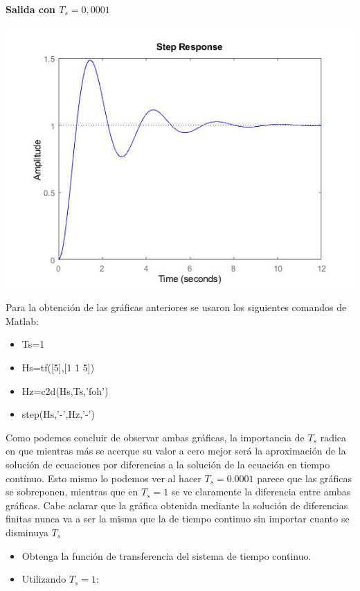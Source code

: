 \noindent \textbf{Salida con $T_s=0,0001$}

\noindent \includegraphics[scale=0.6]{./ImagenParte1y2/SalidaTs00001}

Para la obtención de las gráficas anteriores se usaron los siguientes comandos de Matlab:

\begin{itemize}
\item Ts=1
\item Hs=tf([5],[1 1 5])
\item Hz=c2d(Hs,Ts,'foh')
\item step(Hs,'-',Hz,'-')
\end{itemize}


Como podemos concluir de observar ambas gráficas, la importancia de $T_s$ radica en que mientras más se acerque su valor a cero mejor será la aproximación de la solución de ecuaciones por diferencias a la solución de la ecuación en tiempo contínuo. Esto mismo lo podemos ver al hacer $T_s=0.0001$ parece que las gráficas se sobreponen, mientras que en $T_s=1$ se ve claramente la diferencia entre ambas gráficas. Cabe aclarar que la gráfica obtenida mediante la solución de diferencias finitas nunca va a ser la misma que la de tiempo continuo sin importar cuanto se disminuya $T_s$

\begin{itemize}
	\item Obtenga la función de transferencia del sistema de tiempo continuo.
	\item Utilizando $ T_s = 1 $:
\end{itemize}

